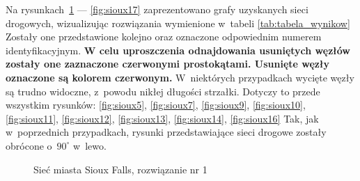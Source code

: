 \documentclass[twoside,12pt]{report}
\begin{document}
Na rysunkach~\ref{fig:sioux1} --- \ref{fig:sioux17} zaprezentowano grafy uzyskanych sieci drogowych, wizualizując rozwiązania wymienione w~tabeli \ref{tab:tabela_wynikow} Zostały one przedstawione kolejno oraz oznaczone odpowiednim numerem identyfikacyjnym. \textbf{W celu uproszczenia odnajdowania usuniętych węzłów zostały one zaznaczone czerwonymi prostokątami. Usunięte węzły oznaczone są kolorem czerwonym.}  W~niektórych przypadkach wycięte węzły są trudno widoczne, z~powodu nikłej długości strzałki. Dotyczy to przede wszystkim rysunków: \ref{fig:sioux5}, \ref{fig:sioux7}, \ref{fig:sioux9}, \ref{fig:sioux10}, \ref{fig:sioux11}, \ref{fig:sioux12}, \ref{fig:sioux13}, \ref{fig:sioux14}, \ref{fig:sioux16} Tak, jak w~poprzednich przypadkach, rysunki przedstawiające sieci drogowe zostały obrócone o~$90^{\circ}$ w~lewo. 


\begin{figure}[htbp]
\centering
{}
\caption{Sieć miasta Sioux Falls, rozwiązanie nr 1}
\label{fig:sioux1}
\end{figure}
\end{document}
